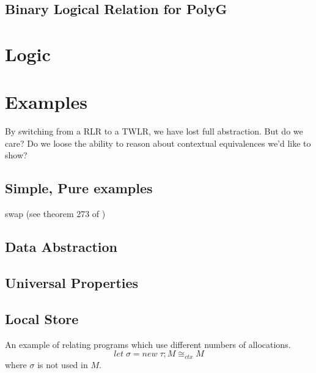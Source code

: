 \documentclass{article}
\begin{document}
\subsection{Binary Logical Relation for PolyG}

\section{Logic}

\section{Examples}
By switching from a RLR to a TWLR\cite{TwoParamThreeUniv}, we have lost full abstraction.
But do we care? Do we loose the ability to reason about contextual equivalences we'd like to show?

\subsection{Simple, Pure examples}
swap (see theorem 273 of \cite{SemFoundGradType})
\subsection{Data Abstraction}
\subsection{Universal Properties}
\subsection{Local Store}
\cite{NominalRelReason} \cite{ParamAndLocalVars} An example of relating programs which use different numbers of allocations.
\[
let\; \sigma = new\; \tau; M \cong_{ctx} M  
\]
where $\sigma$ is not used in $M$.
\end{document}
